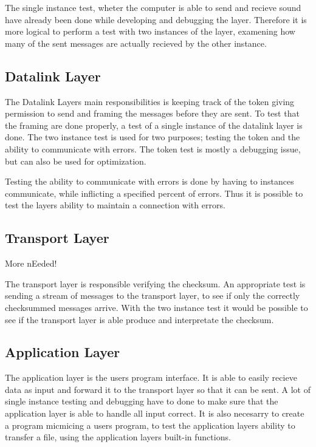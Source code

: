 The single instance test, wheter the computer is able to send and recieve sound have already been done while developing and debugging the layer. Therefore it is more logical to perform a test with two instances of the layer, examening how many of the sent messages are actually recieved by the other instance.

\subsection{Datalink Layer}


The Datalink Layers main responsibilities is keeping track of the token giving permission to send and framing the messages before they are sent.
To test that the framing are done properly, a test of a single instance of the datalink layer is done. The two instance test is used for two purposes; testing the token and the ability to communicate with errors. The token test is mostly a debugging issue, but can also be used for optimization.

Testing the ability to communicate with errors is done by having to instances communicate, while inflicting a specified percent of errors. Thus it is possible to test the layers ability to maintain a connection with errors.


\subsection{Transport Layer}

More nEeded!

The transport layer is responsible verifying the checksum. An appropriate test is sending a stream of messages to the transport layer, to see if only the correctly checksummed messages arrive. With the two instance test it would be possible to see if the transport layer is able produce and interpretate the checksum.

\subsection{Application Layer}

The application layer is the users program interface. It is able to easily recieve data as input and forward it to the transport layer so that it can be sent. A lot of single instance testing and debugging have to done to make sure that the application layer is able to handle all input correct. It is also necesarry to create a program micmicing a users program, to test the application layers ability to transfer a file, using the application layers built-in functions. 


